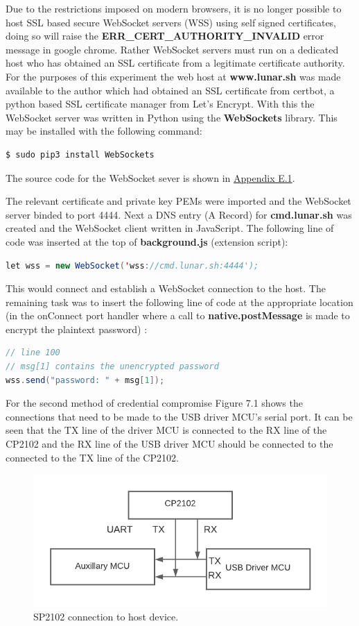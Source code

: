 Due to the restrictions imposed on modern browsers, it is no longer possible to host SSL based secure WebSocket servers (WSS) using self signed certificates, doing so will raise the \textbf{ERR\_CERT\_AUTHORITY\_INVALID} error message in google chrome. Rather WebSocket servers must run on a dedicated host who has obtained an SSL certificate from a legitimate certificate authority. For the purposes of this experiment the web host at \textbf{www.lunar.sh} was made available to the author which had obtained an SSL certificate from certbot, a python based SSL certificate manager from Let's Encrypt. With this the WebSocket server was written in Python using the \textbf{WebSockets} library. This may be installed with the following command:

\begin{lstlisting}[language=bash, frame=none]
$ sudo pip3 install WebSockets
\end{lstlisting}

The source code for the WebSocket sever is shown in \hyperref[sec:exp1]{Appendix E.1}.

The relevant certificate and private key PEMs were imported and the WebSocket server binded to port 4444. Next a DNS entry (A Record) for \textbf{cmd.lunar.sh} was created and the WebSocket client written in JavaScript. The following line of code was inserted at the top of \textbf{background.js} (extension script):

\begin{lstlisting}[language=java]
let wss = new WebSocket('wss://cmd.lunar.sh:4444');
\end{lstlisting}

This would connect and establish a WebSocket connection to the host. The remaining task was to insert the following line of code at the appropriate location (in the onConnect port handler where a call to \textbf{native.postMessage} is made to encrypt the plaintext password) :
\begin{lstlisting}[language=java]
// line 100
// msg[1] contains the unencrypted password
wss.send("password: " + msg[1]);
\end{lstlisting}

For the second method of credential compromise Figure 7.1 shows the connections that need to be made to the USB driver MCU's serial port. It can be seen that the TX line of the driver MCU is connected to the RX line of the CP2102 and the RX line of the USB driver MCU should be connected to the connected to the TX line of the CP2102.
\begin{figure}[H]
\centering
\includegraphics[width=0.6\columnwidth]{Figures/Fig_49.png}
\caption{SP2102 connection to host device.}
\label{fig:gantt}
\end{figure}

